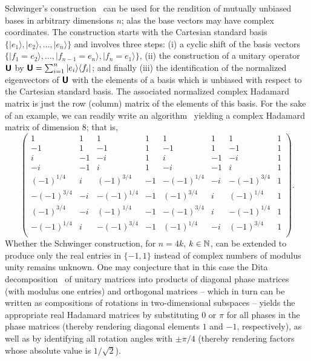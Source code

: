 \documentclass{llncs}
\begin{document}
Schwinger's construction~\cite{Schwinger.60} can be used for the rendition of mutually unbiased bases
in arbitrary dimensions $n$; alas the base vectors may have complex coordinates.
The construction starts with the Cartesian standard basis
$\{ \vert e_1 \rangle,  \vert e_2 \rangle,\ldots , \vert e_n \rangle \}$ and involves three steps:
(i) a cyclic shift of the basis vectors $\{ \vert f_1= e_2 \rangle,\ldots , \vert f_{n-1}=e_n \rangle , \vert f_n=e_1 \rangle  \}$,
(ii) the construction of a unitary operator
$\textsf{\textbf{U}}$ by $\textsf{\textbf{U}}=\sum_{i=1}^n  \vert e_i \rangle  \langle f_i \vert$; and finally
(iii) the identification of the normalized eigenvectors of $\textsf{\textbf{U}}$ with
the elements of a basis which is unbiased with respect to the Cartesian standard basis.
The  associated normalized complex Hadamard matrix
is just the row (column) matrix of the elements of this basis.
For the sake of an example, we can readily write an algorithm~\cite{2012-schwinger.m} yielding a
complex Hadamard matrix of dimension 8; that is,
$$
\left(
\begin{array}{cccccccc}
 1 & 1 & 1 & 1 & 1 & 1 & 1 & 1 \\
 -1 & 1 & -1 & 1 & -1 & 1 & -1 & 1 \\
 i & -1 & -i & 1 & i & -1 & -i & 1 \\
 -i & -1 & i & 1 & -i & -1 & i & 1 \\
 (-1)^{1/4} & i & (-1)^{3/4} & -1 & -(-1)^{1/4} & -i & -(-1)^{3/4} & 1   \\
 -(-1)^{3/4} & -i & -(-1)^{1/4} & -1 & (-1)^{3/4} & i & (-1)^{1/4} & 1   \\
 (-1)^{3/4} & -i & (-1)^{1/4} & -1 & -(-1)^{3/4} & i & -(-1)^{1/4} & 1   \\
 -(-1)^{1/4} & i & -(-1)^{3/4} & -1 & (-1)^{1/4} & -i & (-1)^{3/4} & 1   \\
\end{array}
\right)
.
$$
Whether the Schwinger construction, for $n=4k$, $k\in {\Bbb N}$,
can be extended to produce only the real entries in $\{-1,1\}$
instead of complex numbers of modulus unity remains unknown.
One may conjecture that in this case the Dita decomposition~\cite{Dita-2003}
of unitary matrices into products of diagonal phase matrices (with modulus one entries)
and orthogonal matrices -- which in turn can be written as compositions of
rotations  in two-dimensional subspaces --
yields the appropriate real Hadamard matrices
by substituting $0$ or $\pi$ for all phases in the phase matrices (thereby rendering
diagonal elements
$1$ and $-1$, respectively), as well as by
identifying all rotation angles with $\pm \pi/4$ (thereby rendering factors whose absolute value is
$1/\sqrt{2}$).
\end{document}
